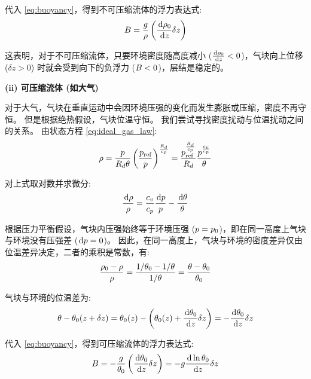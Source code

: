 代入 \eqref{eq:buoyancy}，得到不可压缩流体的浮力表达式:
\begin{equation}
    \buoyancy = \frac{\gravityconst}{\density} \left(\ode{\density_0}{z} \delta z\right)
    \label{eq:buoyancy_incompressible}
\end{equation}

这表明，对于不可压缩流体，只要环境密度随高度减小 ($\ode{\density_0}{z} < 0$)，气块向上位移 ($\delta z > 0$) 时就会受到向下的负浮力 ($B < 0$)，层结是稳定的。

\textbf{(ii) 可压缩流体 (如大气)}

对于大气，气块在垂直运动中会因环境压强的变化而发生膨胀或压缩，密度不再守恒。
但是根据绝热假设，气块位温守恒。
我们尝试寻找密度扰动与位温扰动之间的关系。
由状态方程 \eqref{eq:ideal_gas_law}:
\begin{equation*}
    \rho = \frac{p}{R_d \theta} \left(\frac{p_\text{ref}}{p}\right)^{\frac{R_d}{c_p}} = \frac{p_\text{ref}^{\frac{R_d}{c_p}}}{R_d} \frac{p^{\frac{c_v}{c_p}}}{\theta}
\end{equation*}

对上式取对数并求微分:
\begin{equation*}
    \frac{\mkern2mu \mathrm{d} \rho}{\rho} = \frac{c_v}{c_p} \frac{\mkern2mu \mathrm{d} p}{p} - \frac{\mkern2mu \mathrm{d} \theta}{\theta}
\end{equation*}

根据压力平衡假设，气块内压强始终等于环境压强 ($p = p_0$)，即在同一高度上气块与环境没有压强差 ($\mkern2mu \mathrm{d} p = 0$)。
因此，在同一高度上，气块与环境的密度差异仅由位温差异决定，二者的乘积是常数，有:
\begin{equation*}
    \frac{\rho_0 - \rho}{\rho} = \frac{1/\theta_0 - 1/\theta}{1/\theta} = \frac{\theta - \theta_0}{\theta_0}
\end{equation*}

气块与环境的位温差为:
\begin{equation*}
    \ptemp - \ptemp_0(z+\delta z) = \ptemp_0(z) - \left( \ptemp_0(z) + \ode{\ptemp_0}{z} \delta z \right) = - \ode{\ptemp_0}{z} \delta z
\end{equation*}

代入 \eqref{eq:buoyancy}，得到可压缩流体的浮力表达式:
\begin{equation}
    \buoyancy = -\frac{\gravityconst}{\ptemp_0} \left(\ode{\ptemp_0}{z} \delta z\right) = -\gravityconst \ode{\ln \ptemp_0}{z} \delta z
    \label{eq:buoyancy_compressible}
\end{equation}

